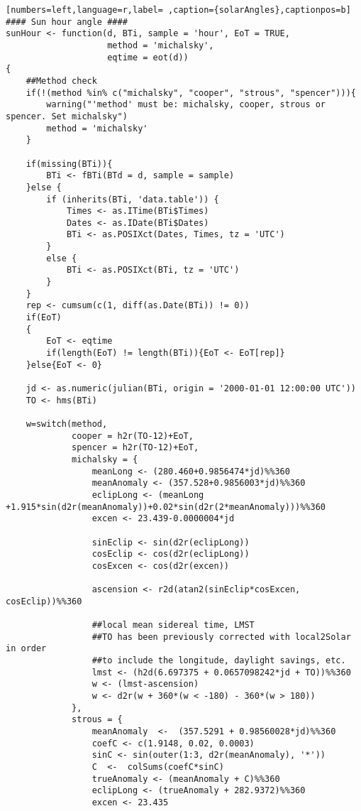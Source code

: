 \begin{lstlisting}[numbers=left,language=r,label= ,caption={solarAngles},captionpos=b]
#### Sun hour angle ####
sunHour <- function(d, BTi, sample = 'hour', EoT = TRUE,
                    method = 'michalsky',
                    eqtime = eot(d))
{
    ##Method check
    if(!(method %in% c("michalsky", "cooper", "strous", "spencer"))){
        warning("'method' must be: michalsky, cooper, strous or spencer. Set michalsky")
        method = 'michalsky'
    }

    if(missing(BTi)){
        BTi <- fBTi(BTd = d, sample = sample)
    }else {
        if (inherits(BTi, 'data.table')) {
            Times <- as.ITime(BTi$Times)
            Dates <- as.IDate(BTi$Dates)
            BTi <- as.POSIXct(Dates, Times, tz = 'UTC')
        }
        else {
            BTi <- as.POSIXct(BTi, tz = 'UTC')
        }   
    }
    rep <- cumsum(c(1, diff(as.Date(BTi)) != 0))
    if(EoT)
    {
        EoT <- eqtime
        if(length(EoT) != length(BTi)){EoT <- EoT[rep]}
    }else{EoT <- 0}

    jd <- as.numeric(julian(BTi, origin = '2000-01-01 12:00:00 UTC'))
    TO <- hms(BTi)

    w=switch(method,
             cooper = h2r(TO-12)+EoT,
             spencer = h2r(TO-12)+EoT,
             michalsky = {
                 meanLong <- (280.460+0.9856474*jd)%%360
                 meanAnomaly <- (357.528+0.9856003*jd)%%360
                 eclipLong <- (meanLong +1.915*sin(d2r(meanAnomaly))+0.02*sin(d2r(2*meanAnomaly)))%%360
                 excen <- 23.439-0.0000004*jd

                 sinEclip <- sin(d2r(eclipLong))
                 cosEclip <- cos(d2r(eclipLong))
                 cosExcen <- cos(d2r(excen))

                 ascension <- r2d(atan2(sinEclip*cosExcen, cosEclip))%%360

                 ##local mean sidereal time, LMST
                 ##TO has been previously corrected with local2Solar in order
                 ##to include the longitude, daylight savings, etc.
                 lmst <- (h2d(6.697375 + 0.0657098242*jd + TO))%%360
                 w <- (lmst-ascension)
                 w <- d2r(w + 360*(w < -180) - 360*(w > 180))
             },
             strous = {
                 meanAnomaly  <-  (357.5291 + 0.98560028*jd)%%360
                 coefC <- c(1.9148, 0.02, 0.0003)
                 sinC <- sin(outer(1:3, d2r(meanAnomaly), '*'))
                 C  <-  colSums(coefC*sinC)
                 trueAnomaly <- (meanAnomaly + C)%%360
                 eclipLong <- (trueAnomaly + 282.9372)%%360
                 excen <- 23.435


\end{lstlisting}
